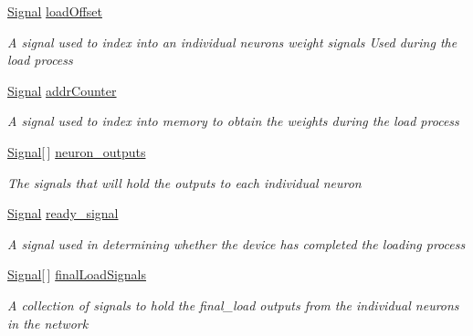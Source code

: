 \begin{DoxyCompactItemize}
\hyperlink{class_n_n_gen_1_1_signal}{Signal} \hyperlink{class_n_n_gen_1_1_async_neural_network_aedc34ca8e8b46a154d3953776c809cd9}{load\+Offset}
\begin{DoxyCompactList}\small\item\em A signal used to index into an individual neuron\textquotesingle{}s weight signals Used during the load process \end{DoxyCompactList}\item 
\hyperlink{class_n_n_gen_1_1_signal}{Signal} \hyperlink{class_n_n_gen_1_1_async_neural_network_a62f80368a823158ee82fd29b879ad157}{addr\+Counter}
\begin{DoxyCompactList}\small\item\em A signal used to index into memory to obtain the weights during the load process \end{DoxyCompactList}\item 
\hyperlink{class_n_n_gen_1_1_signal}{Signal}\mbox{[}$\,$\mbox{]} \hyperlink{class_n_n_gen_1_1_async_neural_network_ac912fc0d486aeb193cf0f104f06b68a4}{neuron\+\_\+outputs}
\begin{DoxyCompactList}\small\item\em The signals that will hold the outputs to each individual neuron \end{DoxyCompactList}\item 
\hyperlink{class_n_n_gen_1_1_signal}{Signal} \hyperlink{class_n_n_gen_1_1_async_neural_network_ade446cacb56d0ddf2aae1510e2425591}{ready\+\_\+signal}
\begin{DoxyCompactList}\small\item\em A signal used in determining whether the device has completed the loading process \end{DoxyCompactList}\item 
\hyperlink{class_n_n_gen_1_1_signal}{Signal}\mbox{[}$\,$\mbox{]} \hyperlink{class_n_n_gen_1_1_async_neural_network_a17ce3ebd6db5f93a473bd2b45527c726}{final\+Load\+Signals}
\begin{DoxyCompactList}\small\item\em A collection of signals to hold the final\+\_\+load outputs from the individual neurons in the network \end{DoxyCompactList}\item 

\end{DoxyCompactItemize}
